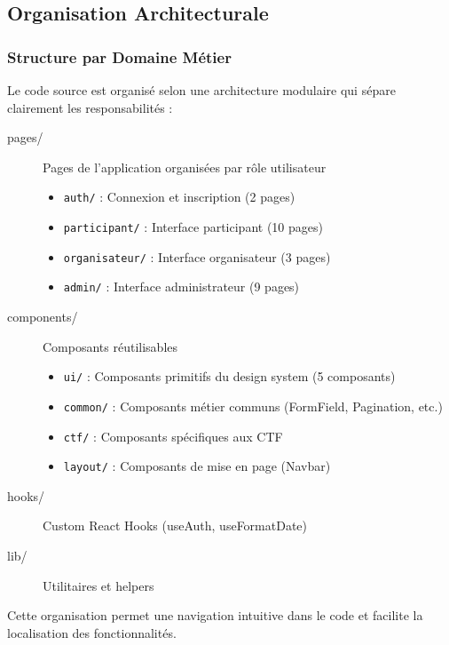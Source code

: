 \subsection{Organisation Architecturale}

\subsubsection{Structure par Domaine Métier}

Le code source est organisé selon une architecture modulaire qui sépare clairement les responsabilités :

\begin{tcolorbox}[colback=green!5!white,colframe=green!75!black,title=Organisation des Dossiers]
\begin{description}
    \item[pages/] Pages de l'application organisées par rôle utilisateur
    \begin{itemize}
        \item \texttt{auth/} : Connexion et inscription (2 pages)
        \item \texttt{participant/} : Interface participant (10 pages)
        \item \texttt{organisateur/} : Interface organisateur (3 pages)
        \item \texttt{admin/} : Interface administrateur (9 pages)
    \end{itemize}
    \item[components/] Composants réutilisables
    \begin{itemize}
        \item \texttt{ui/} : Composants primitifs du design system (5 composants)
        \item \texttt{common/} : Composants métier communs (FormField, Pagination, etc.)
        \item \texttt{ctf/} : Composants spécifiques aux CTF
        \item \texttt{layout/} : Composants de mise en page (Navbar)
    \end{itemize}
    \item[hooks/] Custom React Hooks (useAuth, useFormatDate)
    \item[lib/] Utilitaires et helpers
\end{description}
\end{tcolorbox}

Cette organisation permet une navigation intuitive dans le code et facilite la localisation des fonctionnalités.

